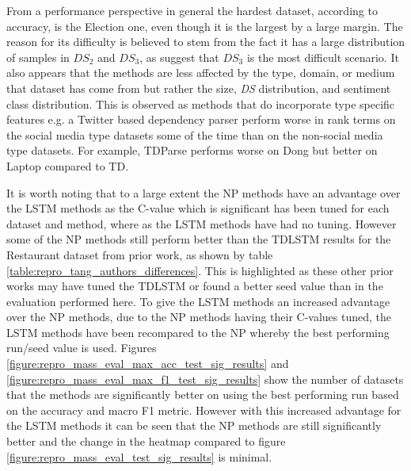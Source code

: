 From a performance perspective in general the hardest dataset, according to accuracy, is the Election one, even though it is the largest by a large margin. The reason for its difficulty is believed to stem from the fact it has a large distribution of samples in $DS_2$ and $DS_3$, as \citet{wang-etal-2017-tdparse} suggest that $DS_3$ is the most difficult scenario. It also appears that the methods are less affected by the type, domain, or medium that dataset has come from but rather the size, \textit{DS} distribution, and sentiment class distribution. This is observed as methods that do incorporate type specific features e.g. a Twitter based dependency parser perform worse in rank terms on the social media type datasets some of the time than on the non-social media type datasets. For example, TDParse performs worse on Dong but better on Laptop compared to TD.

It is worth noting that to a large extent the NP methods have an advantage over the LSTM methods as the C-value which is significant has been tuned for each dataset and method, where as the LSTM methods have had no tuning. However some of the NP methods still perform better than the TDLSTM results for the Restaurant dataset from prior work, as shown by table \ref{table:repro_tang_authors_differences}. This is highlighted as these other prior works may have tuned the TDLSTM or found a better seed value than in the evaluation performed here. To give the LSTM methods an increased advantage over the NP methods, due to the NP methods having their C-values tuned, the LSTM methods have been recompared to the NP whereby the best performing run/seed value is used. Figures \ref{figure:repro_mass_eval_max_acc_test_sig_results} and \ref{figure:repro_mass_eval_max_f1_test_sig_results} show the number of datasets that the methods are significantly better on using the best performing run based on the accuracy and macro F1 metric. However with this increased advantage for the LSTM methods it can be seen that the NP methods are still significantly better and the change in the heatmap compared to figure \ref{figure:repro_mass_eval_test_sig_results} is minimal. 

